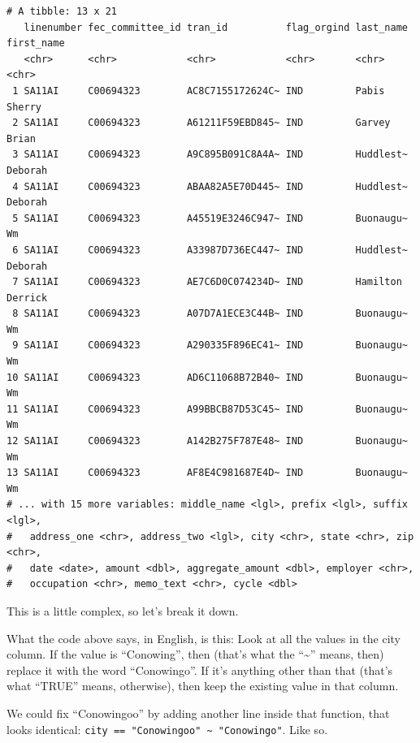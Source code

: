 \documentclass[
  letterpaper,
  DIV=11,
  numbers=noendperiod]{scrreprt}
\begin{document}
\begin{verbatim}
# A tibble: 13 x 21
   linenumber fec_committee_id tran_id          flag_orgind last_name first_name
   <chr>      <chr>            <chr>            <chr>       <chr>     <chr>     
 1 SA11AI     C00694323        AC8C7155172624C~ IND         Pabis     Sherry    
 2 SA11AI     C00694323        A61211F59EBD845~ IND         Garvey    Brian     
 3 SA11AI     C00694323        A9C895B091C8A4A~ IND         Huddlest~ Deborah   
 4 SA11AI     C00694323        ABAA82A5E70D445~ IND         Huddlest~ Deborah   
 5 SA11AI     C00694323        A45519E3246C947~ IND         Buonaugu~ Wm        
 6 SA11AI     C00694323        A33987D736EC447~ IND         Huddlest~ Deborah   
 7 SA11AI     C00694323        AE7C6D0C074234D~ IND         Hamilton  Derrick   
 8 SA11AI     C00694323        A07D7A1ECE3C44B~ IND         Buonaugu~ Wm        
 9 SA11AI     C00694323        A290335F896EC41~ IND         Buonaugu~ Wm        
10 SA11AI     C00694323        AD6C11068B72B40~ IND         Buonaugu~ Wm        
11 SA11AI     C00694323        A99BBCB87D53C45~ IND         Buonaugu~ Wm        
12 SA11AI     C00694323        A142B275F787E48~ IND         Buonaugu~ Wm        
13 SA11AI     C00694323        AF8E4C981687E4D~ IND         Buonaugu~ Wm        
# ... with 15 more variables: middle_name <lgl>, prefix <lgl>, suffix <lgl>,
#   address_one <chr>, address_two <lgl>, city <chr>, state <chr>, zip <chr>,
#   date <date>, amount <dbl>, aggregate_amount <dbl>, employer <chr>,
#   occupation <chr>, memo_text <chr>, cycle <dbl>
\end{verbatim}

This is a little complex, so let's break it down.

What the code above says, in English, is this: Look at all the values in
the city column. If the value is ``Conowing'', then (that's what the
``\textasciitilde{}'' means, then) replace it with the word
``Conowingo''. If it's anything other than that (that's what ``TRUE''
means, otherwise), then keep the existing value in that column.

We could fix ``Conowingoo'' by adding another line inside that function,
that looks identical:
\texttt{city\ ==\ "Conowingoo"\ \textasciitilde{}\ "Conowingo"}. Like
so.
\end{document}
